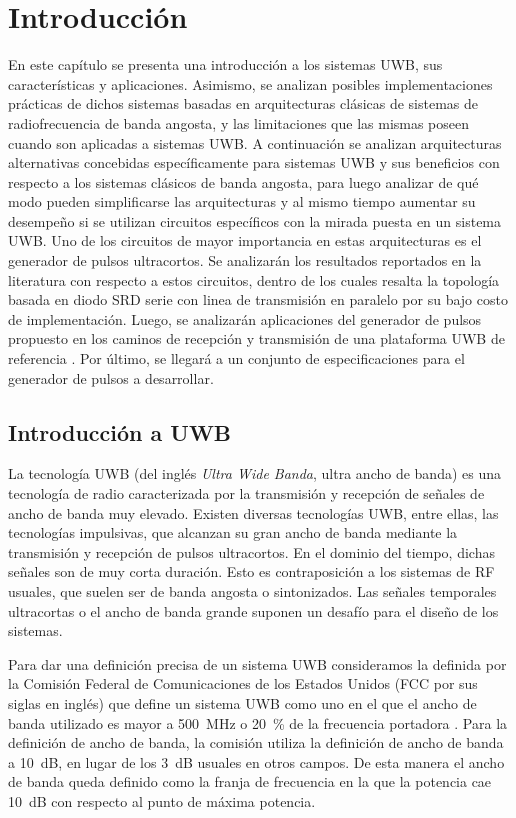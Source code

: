 \chapter{Introducción}

En este capítulo se presenta una introducción a los sistemas UWB, sus
características y aplicaciones. Asimismo, se analizan posibles implementaciones
prácticas de dichos sistemas basadas en arquitecturas clásicas de sistemas de
radiofrecuencia de banda angosta, y las limitaciones que las mismas poseen
cuando son aplicadas a sistemas UWB. A continuación se analizan arquitecturas
alternativas concebidas específicamente para sistemas UWB y sus beneficios con
respecto a los sistemas clásicos de banda angosta, para luego analizar de qué
modo pueden simplificarse las arquitecturas y al mismo tiempo aumentar su
desempeño si se utilizan circuitos específicos con la mirada puesta en un
sistema UWB. Uno de los circuitos de mayor importancia en estas arquitecturas es
el generador de pulsos ultracortos. Se analizarán los resultados reportados en
la literatura con respecto a estos circuitos, dentro de los cuales resalta la
topología basada en diodo SRD serie con linea de transmisión en paralelo por su
bajo costo de implementación. Luego, se analizarán aplicaciones del generador de
pulsos propuesto en los caminos de recepción y transmisión de una plataforma UWB
de referencia \cite{Altieri2021}. Por último, se llegará a un conjunto de
especificaciones para el generador de pulsos a desarrollar.

\section{Introducción a UWB}

La tecnología UWB (del inglés \textit{Ultra Wide Banda}, ultra ancho de banda)
es una tecnología de radio caracterizada por la transmisión y recepción de
señales de ancho de banda muy elevado. Existen diversas tecnologías UWB, entre
ellas, las tecnologías impulsivas, que alcanzan su gran ancho de banda mediante
la transmisión y recepción de pulsos ultracortos. En el dominio del tiempo,
dichas señales son de muy corta duración. Esto es contraposición a los sistemas
de RF usuales, que suelen ser de banda angosta o sintonizados. Las señales
temporales ultracortas o el ancho de banda grande suponen un desafío para el
diseño de los sistemas.

Para dar una definición precisa de un sistema UWB consideramos la definida por
la Comisión Federal de Comunicaciones de los Estados Unidos (FCC por sus siglas
en inglés) que define un sistema UWB como uno en el que el ancho de banda
utilizado es mayor a \qty{500}{\mega\hertz} o \qty{20}{\percent} de la
frecuencia portadora \cite{FCC_UWB}. Para la definición de ancho de banda, la
comisión utiliza la definición de ancho de banda a \qty{10}{\dB}, en lugar de
los \qty{3}{\dB} usuales en otros campos. De esta manera el ancho de banda queda
definido como la franja de frecuencia en la que la potencia cae \qty{10}{\dB}
con respecto al punto de máxima potencia.

